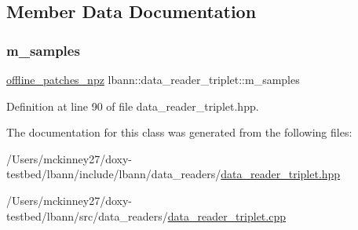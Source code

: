 \subsection{Member Data Documentation}
\mbox{\label{classlbann_1_1data__reader__triplet_a1f414c6d80f6e48fc91f98db0531f1f8}} 
\subsubsection{\texorpdfstring{m\+\_\+samples}{m\_samples}}
{\footnotesize\ttfamily \hyperlink{classlbann_1_1offline__patches__npz}{offline\+\_\+patches\+\_\+npz} lbann\+::data\+\_\+reader\+\_\+triplet\+::m\+\_\+samples\hspace{0.3cm}{\ttfamily [protected]}}



Definition at line 90 of file data\+\_\+reader\+\_\+triplet.\+hpp.



The documentation for this class was generated from the following files\+:\begin{DoxyCompactItemize}
\item 
/\+Users/mckinney27/doxy-\/testbed/lbann/include/lbann/data\+\_\+readers/\hyperlink{data__reader__triplet_8hpp}{data\+\_\+reader\+\_\+triplet.\+hpp}\item 
/\+Users/mckinney27/doxy-\/testbed/lbann/src/data\+\_\+readers/\hyperlink{data__reader__triplet_8cpp}{data\+\_\+reader\+\_\+triplet.\+cpp}\end{DoxyCompactItemize}
